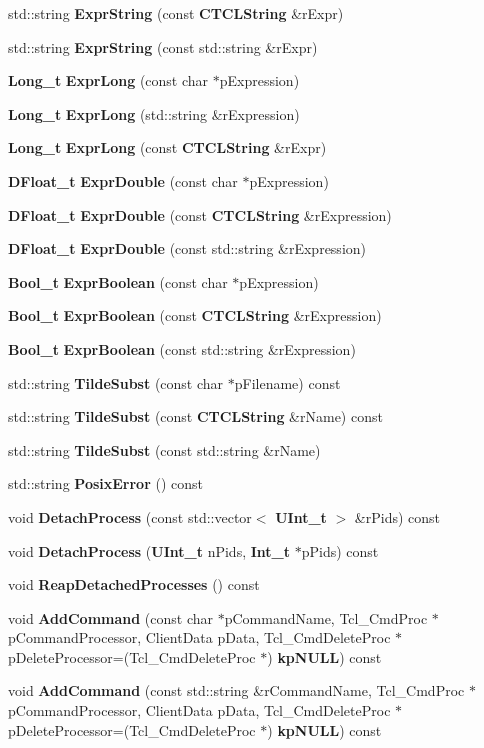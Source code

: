 \begin{CompactItemize}
\item 
std::string {\bf Expr\-String} (const {\bf CTCLString} \&r\-Expr)
\item 
std::string {\bf Expr\-String} (const std::string \&r\-Expr)
\item 
{\bf Long\_\-t} {\bf Expr\-Long} (const char $\ast$p\-Expression)
\item 
{\bf Long\_\-t} {\bf Expr\-Long} (std::string \&r\-Expression)
\item 
{\bf Long\_\-t} {\bf Expr\-Long} (const {\bf CTCLString} \&r\-Expr)
\item 
{\bf DFloat\_\-t} {\bf Expr\-Double} (const char $\ast$p\-Expression)
\item 
{\bf DFloat\_\-t} {\bf Expr\-Double} (const {\bf CTCLString} \&r\-Expression)
\item 
{\bf DFloat\_\-t} {\bf Expr\-Double} (const std::string \&r\-Expression)
\item 
{\bf Bool\_\-t} {\bf Expr\-Boolean} (const char $\ast$p\-Expression)
\item 
{\bf Bool\_\-t} {\bf Expr\-Boolean} (const {\bf CTCLString} \&r\-Expression)
\item 
{\bf Bool\_\-t} {\bf Expr\-Boolean} (const std::string \&r\-Expression)
\item 
std::string {\bf Tilde\-Subst} (const char $\ast$p\-Filename) const
\item 
std::string {\bf Tilde\-Subst} (const {\bf CTCLString} \&r\-Name) const
\item 
std::string {\bf Tilde\-Subst} (const std::string \&r\-Name)
\item 
std::string {\bf Posix\-Error} () const
\item 
void {\bf Detach\-Process} (const std::vector$<$ {\bf UInt\_\-t} $>$ \&r\-Pids) const
\item 
void {\bf Detach\-Process} ({\bf UInt\_\-t} n\-Pids, {\bf Int\_\-t} $\ast$p\-Pids) const
\item 
void {\bf Reap\-Detached\-Processes} () const
\item 
void {\bf Add\-Command} (const char $\ast$p\-Command\-Name, Tcl\_\-Cmd\-Proc $\ast$p\-Command\-Processor, Client\-Data p\-Data, Tcl\_\-Cmd\-Delete\-Proc $\ast$p\-Delete\-Processor=(Tcl\_\-Cmd\-Delete\-Proc $\ast$) {\bf kp\-NULL}) const
\item 
void {\bf Add\-Command} (const std::string \&r\-Command\-Name, Tcl\_\-Cmd\-Proc $\ast$p\-Command\-Processor, Client\-Data p\-Data, Tcl\_\-Cmd\-Delete\-Proc $\ast$p\-Delete\-Processor=(Tcl\_\-Cmd\-Delete\-Proc $\ast$) {\bf kp\-NULL}) const

\end{CompactItemize}
